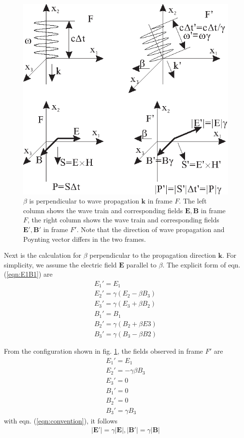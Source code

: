 \documentclass[prd,showpacs,twocolumn]{revtex4-1}
\begin{document}
\begin{figure}
\center
\includegraphics{Graph2.eps}
\caption{$\beta$ is perpendicular to wave propagation $\mathbf{k}$ in frame $F$. The left column shows the wave train and corresponding fields $\mathbf{E}, \mathbf{B}$ in frame $F$, the right column shows the wave train and corresponding fields $\mathbf{E}', \mathbf{B}'$ in frame $F'$. Note that the direction of wave propagation and Poynting vector differs in the two frames.}
\label{fig:V}
\end{figure}

Next is the calculation for $\beta$ perpendicular to the propagation direction $\mathbf{k}$. For simplicity, we assume the electric field $\mathbf{E}$ parallel to $\beta$. The explicit form of eqn. (\ref{eqn:E1B1}) are
\begin{eqnarray}
E_1'=E_1\nonumber\\
E_2'=\gamma(E_2-\beta B_3)\nonumber\\
E_3'=\gamma(E_3+\beta B_2)\nonumber\\
B_1'=B_1\nonumber\\
B_2'=\gamma(B_2+\beta E3)\nonumber\\
B_3'=\gamma(B_3-\beta B2)
\end{eqnarray}

From the configuration shown in fig. \ref{fig:V}, the fields observed in frame $F'$ are
\begin{eqnarray}
E_1'=E_1\nonumber\\
E_2'=-\gamma\beta B_3\nonumber\\
E_3'=0\nonumber\\
B_1'=0\nonumber\\
B_2'=0\nonumber\\
B_3'=\gamma B_3
\end{eqnarray}
with eqn. (\ref{eqn:convention}), it follows
\begin{eqnarray}
|\mathbf{E}'|=\gamma|\mathbf{E}|, |\mathbf{B}'|=\gamma|\mathbf{B}|
\label{eqn:fV}
\end{eqnarray}
\end{document}
